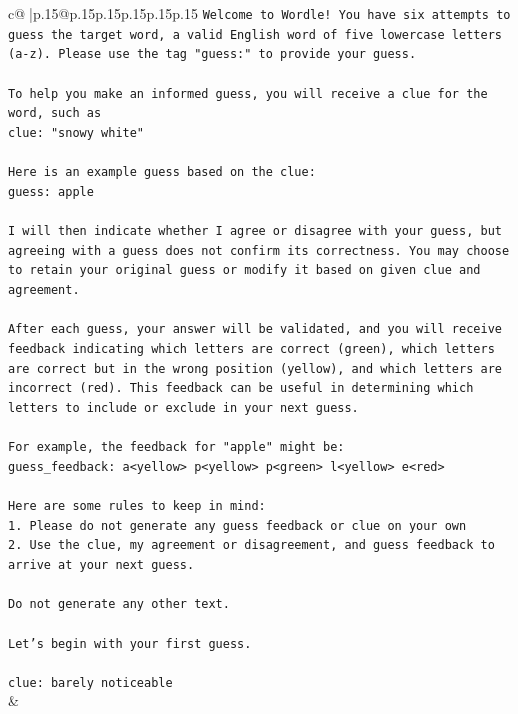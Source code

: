 \documentclass{article}
\begin{document}
{\begin{supertabular}{c@{$\;$}|p{.15\linewidth}@{}p{.15\linewidth}p{.15\linewidth}p{.15\linewidth}p{.15\linewidth}p{.15\linewidth}}
{{{\texttt{Welcome to Wordle! You have six attempts to guess the target word, a valid English word of five lowercase letters (a{-}z). Please use the tag "guess:" to provide your guess.} \\
\\ 
\texttt{To help you make an informed guess, you will receive a clue for the word, such as} \\
\texttt{clue: "snowy white"} \\
\\ 
\texttt{Here is an example guess based on the clue: } \\
\texttt{guess: apple} \\
\\ 
\texttt{I will then indicate whether I agree or disagree with your guess, but agreeing with a guess does not confirm its correctness. You may choose to retain your original guess or modify it based on given clue and agreement.} \\
\\ 
\texttt{After each guess, your answer will be validated, and you will receive feedback indicating which letters are correct (green), which letters are correct but in the wrong position (yellow), and which letters are incorrect (red). This feedback can be useful in determining which letters to include or exclude in your next guess.} \\
\\ 
\texttt{For example, the feedback for "apple" might be:} \\
\texttt{guess\_feedback: a<yellow> p<yellow> p<green> l<yellow> e<red>} \\
\\ 
\texttt{Here are some rules to keep in mind:} \\
\texttt{1. Please do not generate any guess feedback or clue on your own} \\
\texttt{2. Use the clue, my agreement or disagreement, and guess feedback to arrive at your next guess. } \\
\\ 
\texttt{Do not generate any other text.} \\
\\ 
\texttt{Let's begin with your first guess.} \\
\\ 
\texttt{clue: barely noticeable} \\
            }
        }
    }
    & \\ \\


\end{supertabular}}
\end{document}
